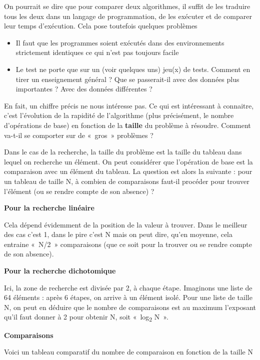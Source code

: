 {
On pourrait se dire que pour comparer deux algorithmes, il suffit de les
traduire tous les deux dans un langage de programmation, de les
exécuter et de comparer leur temps d’exécution. Cela pose toutefois
quelques problèmes}

\liststyleListv
\begin{itemize}
\item {
Il faut que les programmes soient exécutés dans des environnements
strictement identiques ce qui n’est pas toujours facile}
\item {
Le test ne porte que sur un (voir quelques uns) jeu(x) de tests. Comment
en tirer un enseignement général ? Que se passerait-il avec des données
plus importantes ? Avec des données différentes ?}
\end{itemize}
{
En fait, un chiffre précis ne nous intéresse pas. Ce qui est intéressant
à connaitre, c’est l’évolution de la rapidité de l’algorithme (plus
précisément, le nombre d’opérations de base) en fonction de la
\textbf{taille} du problème à résoudre. Comment va-t-il se comporter
sur de «~gros~» problèmes ?}

{
Dans le cas de la recherche, la taille du problème est la taille du
tableau dans lequel on recherche un élément. On peut considérer que
l’opération de base est la comparaison avec un élément du tableau. La
question est alors la suivante : pour un tableau de taille N, à combien
de comparaisons faut-il procéder pour trouver l’élément (ou se rendre
compte de son absence) ?}

{\bfseries
Pour la recherche linéaire}

{
Cela dépend évidemment de la position de la valeur à trouver. Dans le
meilleur des cas c’est 1, dans le pire c’est N mais on peut dire, qu’en
moyenne, cela entraine «~N/2~» comparaisons (que ce soit pour la
trouver ou se rendre compte de son absence).}

{\bfseries
Pour la recherche dichotomique}

{
Ici, la zone de recherche est divisée par 2, à chaque étape. Imaginons
une liste de 64 éléments : après 6 étapes, on arrive à un élément
isolé. Pour une liste de taille N, on peut en déduire que le nombre de
comparaisons est au maximum l'exposant
qu'il faut donner à 2 pour obtenir N, soit
«~log\textsubscript{2 }N~».}

{\sffamily\bfseries\upshape
Comparaisons}

{
Voici un tableau comparatif du nombre de comparaison en fonction de la
taille N}

